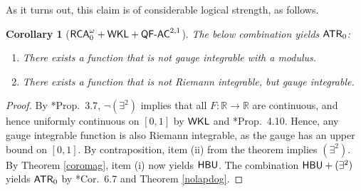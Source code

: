 \documentclass[reqno]{amsart}
\newtheorem{cor}[thm]{Corollary}
\def\ATR{\textup{\textsf{ATR}}}
\def\RCAo{\textup{\textsf{RCA}}_{0}^{\omega}}
\def\WKL{\textup{\textsf{WKL}}}
\def\R{{\mathbb  R}}
\def\di{\rightarrow}
\def\QFAC{\textup{\textsf{QF-AC}}}
\def\HBU{\textup{\textsf{HBU}}}
\numberwithin{equation}{section}
\numberwithin{thm}{section}
\begin{document}
As it turns out, this claim is of considerable logical strength, as follows.  
\begin{cor}[$\RCAo+\WKL+\QFAC^{2,1}$]\label{ofvaluesee}
The below combination yields $\ATR_{0}$:
\begin{enumerate}
\item[(i)] There exists a function that is not gauge integrable with a modulus.  %
\item[(ii)] There exists a function that is not Riemann integrable, but gauge integrable. 
\end{enumerate}
\end{cor}
\begin{proof}
By \cite{kohlenbach2}*{Prop.\ 3.7}, $\neg(\exists^{2})$ implies that all $F:\R\di\R$ are continuous, and hence uniformly continuous on $[0,1]$ by $\WKL$ and \cite{kohlenbach4}*{Prop.\ 4.10}.
Hence, any gauge integrable function is also Riemann integrable, as the gauge has an upper bound on $[0,1]$.  By contraposition, item (ii) from the theorem implies $(\exists^{2})$.  
By Theorem \ref{coromag}, item (i) now yields $\HBU$.  The combination $\HBU+(\exists^{2})$ yields $\ATR_{0}$ by \cite{dagsam}*{Cor.\ 6.7} and Theorem \ref{nolapdog}. 
\end{proof}
\end{document}
